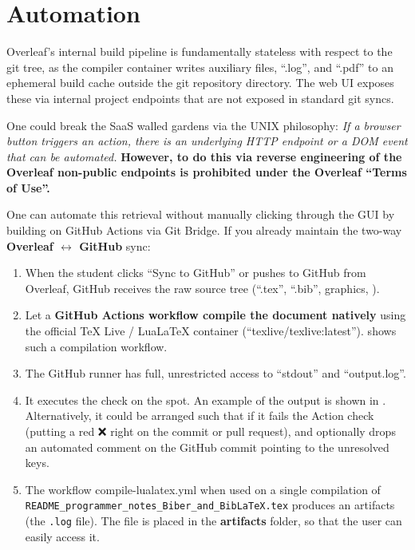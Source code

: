 \documentclass[12pt, twoside]{article}
\newcommand{\dname}[1]{\textbf{#1}}
\newcommand{\fname}[1]{\texttt{#1}}
\begin{document}
\section{Automation}
\label{sec:Automation}

Overleaf's internal build pipeline is fundamentally stateless with respect to the git tree, as the compiler container writes auxiliary files, \enquote{.log}, and \enquote{.pdf} to an ephemeral build cache outside the git repository directory. The web \gls{UI} exposes these via internal project endpoints that are not exposed in standard git syncs.

One could break the \gls{SaaS} walled gardens via the UNIX philosophy: \textit{If a browser button triggers an action, there is an underlying HTTP endpoint or a DOM event that can be automated.} \textbf{However, to do this via reverse engineering of the Overleaf non-public endpoints is prohibited under the Overleaf \enquote{Terms of Use}.}

One can automate this retrieval without manually clicking through the \gls{GUI} by building on GitHub Actions via Git Bridge. If you already maintain the two-way \textbf{Overleaf $\longleftrightarrow$ GitHub} sync:
\begin{enumerate}
    \item When the student clicks \enquote{Sync to GitHub} or pushes to GitHub from Overleaf, GitHub receives the raw source tree (\enquote{.tex}, \enquote{.bib}, graphics, \etc).
    
    \item Let a \textbf{GitHub Actions workflow compile the document natively} using the official TeX Live / LuaLaTeX container (\enquote{texlive/texlive:latest}).  shows such a compilation workflow.
    
    \item The GitHub runner has full, unrestricted access to \enquote{stdout} and \enquote{output.log}.
    
    \item It executes the check on the spot. An example of the output is shown in . Alternatively, it could be arranged such that if it fails the Action check (putting a red ❌ right on the commit or pull request), and optionally drops an automated comment on the GitHub commit pointing to the unresolved keys.

    \item The workflow compile-lualatex.yml when used on a single compilation of \fname{README\_programmer\_notes\_Biber\_and\_BibLaTeX.tex} produces an artifacts (the \fname{.log} file). The file is placed in the \dname{artifacts} folder, so that the user can easily access it.
\end{enumerate}
\end{document}
